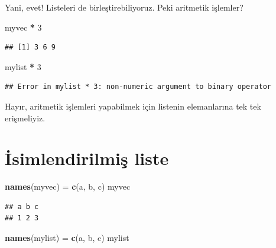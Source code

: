 \documentclass[
]{book}
\newenvironment{Shaded}{\begin{snugshade}}{\end{snugshade}}
\newcommand{\DecValTok}[1]{\textcolor[rgb]{0.00,0.00,0.81}{#1}}
\newcommand{\KeywordTok}[1]{\textcolor[rgb]{0.13,0.29,0.53}{\textbf{#1}}}
\newcommand{\NormalTok}[1]{#1}
\newcommand{\OperatorTok}[1]{\textcolor[rgb]{0.81,0.36,0.00}{\textbf{#1}}}
\newcommand{\StringTok}[1]{\textcolor[rgb]{0.31,0.60,0.02}{#1}}
\begin{document}
Yani, evet! Listeleri de birleştirebiliyoruz. Peki aritmetik işlemler?

\begin{Shaded}
\begin{Highlighting}[]
\NormalTok{myvec }\OperatorTok{*}\StringTok{ }\DecValTok{3}
\end{Highlighting}
\end{Shaded}

\begin{verbatim}
## [1] 3 6 9
\end{verbatim}

\begin{Shaded}
\begin{Highlighting}[]
\NormalTok{mylist }\OperatorTok{*}\StringTok{ }\DecValTok{3}
\end{Highlighting}
\end{Shaded}

\begin{verbatim}
## Error in mylist * 3: non-numeric argument to binary operator
\end{verbatim}

Hayır, aritmetik işlemleri yapabilmek için listenin elemanlarına tek tek erişmeliyiz.

\hypertarget{isimlendirilmiux15f-liste}{%
\section{İsimlendirilmiş liste}\label{isimlendirilmiux15f-liste}}

\begin{Shaded}
\begin{Highlighting}[]
\KeywordTok{names}\NormalTok{(myvec) =}\StringTok{ }\KeywordTok{c}\NormalTok{(}\StringTok{\textquotesingle{}a\textquotesingle{}}\NormalTok{, }\StringTok{\textquotesingle{}b\textquotesingle{}}\NormalTok{, }\StringTok{\textquotesingle{}c\textquotesingle{}}\NormalTok{)}
\NormalTok{myvec}
\end{Highlighting}
\end{Shaded}

\begin{verbatim}
## a b c 
## 1 2 3
\end{verbatim}

\begin{Shaded}
\begin{Highlighting}[]
\KeywordTok{names}\NormalTok{(mylist) =}\StringTok{ }\KeywordTok{c}\NormalTok{(}\StringTok{\textquotesingle{}a\textquotesingle{}}\NormalTok{, }\StringTok{\textquotesingle{}b\textquotesingle{}}\NormalTok{, }\StringTok{\textquotesingle{}c\textquotesingle{}}\NormalTok{)}
\NormalTok{mylist}
\end{Highlighting}
\end{Shaded}
\end{document}
